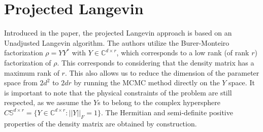 \documentclass[12pt]{memoir}
\begin{document}
\section{Projected Langevin}

Introduced in the \cite{meth:bayesian:Langevin:ACMT2024} paper, the projected Langevin approach is based on an Unadjusted Langevin algorithm. The authors utilize the Burer-Monteiro factorization $\rho = Y Y^*$ with $Y \in \mathbb{C}^{d \times r}$, which corresponds to a low rank (of rank $r$) factorization of $\rho$. This corresponds to considering that the density matrix has a maximum rank of $r$. This also allows us to reduce the dimension of the parameter space from $2d^2$ to $2dr$ by running the MCMC method directly on the $Y$ space. It is important to note that the physical constraints of the problem are still respected, as we assume the $Y$s to belong to the complex hypersphere $C \mathbb{S}^{d\times r} = \{ Y \in \mathbb{C}^{d\times r}: ||Y||_F = 1\}$. The Hermitian and semi-definite positive properties of the density matrix are obtained by construction.\medskip
\end{document}
